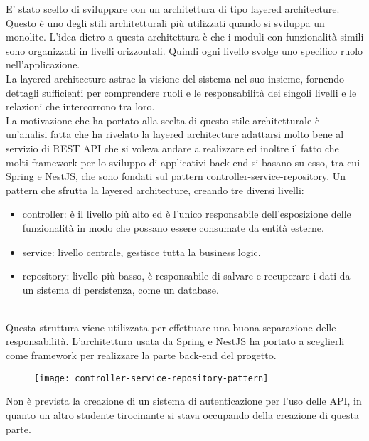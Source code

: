 E' stato scelto di sviluppare con un architettura di tipo layered architecture. Questo è uno
degli stili architetturali più utilizzati quando si sviluppa un monolite. L'idea dietro a 
questa architettura è che i moduli con funzionalità simili sono organizzati in livelli
orizzontali. Quindi ogni livello svolge uno specifico ruolo nell'applicazione.
\\
La layered architecture astrae la visione del sistema nel suo insieme, fornendo dettagli 
sufficienti per comprendere ruoli e le responsabilità dei singoli livelli e le relazioni
che intercorrono tra loro.
\\
La motivazione che ha portato alla scelta di questo stile architetturale è un'analisi fatta
che ha rivelato la layered architecture adattarsi molto bene al servizio di REST API che
si voleva andare a realizzare ed inoltre il fatto
che molti framework per lo sviluppo di applicativi back-end si basano su esso, tra cui
Spring e NestJS, che sono fondati sul pattern controller-service-repository. Un pattern
che sfrutta la layered architecture, creando tre diversi livelli: 
\begin{itemize}
    \item controller: è il livello più alto ed è l'unico responsabile dell'esposizione delle
        funzionalità in modo che possano essere consumate da entità esterne.
    \item service: livello centrale, gestisce tutta la business logic.
    \item repository: livello più basso, è responsabile di salvare e recuperare i dati da un
        sistema di persistenza, come un database.
\end{itemize}
\leavevmode\newline
\\
Questa struttura viene utilizzata per effettuare una buona separazione delle responsabilità.
L'architettura usata da Spring e NestJS ha portato a sceglierli come framework per realizzare
la parte back-end del progetto.
\leavevmode\newline
\begin{figure}[!h]
    \centering
    \texttt{[image: controller-service-repository-pattern]}
\end{figure}

Non è prevista la creazione di un sistema di autenticazione per l'uso delle API, in quanto 
un altro studente tirocinante si stava occupando della creazione di questa parte.

